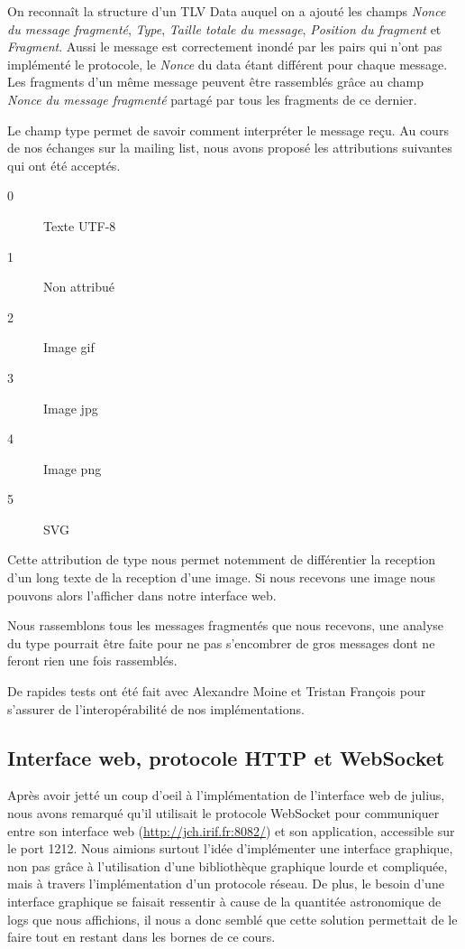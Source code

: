 \documentclass[a4paper,10pt]{article} %
\begin{document}
On reconnaît la structure d'un TLV Data auquel on a ajouté les champs \textit{Nonce du message fragmenté}, \textit{Type}, \textit{Taille totale du message}, \textit{Position du fragment} et \textit{Fragment}. Aussi le message est correctement inondé par les pairs qui n'ont pas implémenté le protocole, le \textit{Nonce} du data étant différent pour chaque message. Les fragments d'un même message peuvent être rassemblés grâce au champ \textit{Nonce du message fragmenté} partagé par tous les fragments de ce dernier.

Le champ type permet de savoir comment interpréter le message reçu. Au cours de nos échanges sur la mailing list, nous avons proposé les attributions suivantes qui ont été acceptés.

\begin{description}
\item[0] Texte UTF-8
\item[1] Non attribué
\item[2] Image gif
\item[3] Image jpg
\item[4] Image png
\item[5] SVG
\end{description}

Cette attribution de type nous permet notemment de différentier la reception d'un long texte de la reception d'une image. Si nous recevons une image nous pouvons alors l'afficher dans notre interface web.

Nous rassemblons tous les messages fragmentés que nous recevons, une analyse du type pourrait être faite pour ne pas s'encombrer de gros messages dont ne feront rien une fois rassemblés.

De rapides tests ont été fait avec \textrm{Alexandre Moine} et \textrm{Tristan François} pour s'assurer de l'interopérabilité de nos implémentations.

\subsection{Interface web, protocole HTTP et WebSocket\label{sec:web}}

Après avoir jetté un coup d'oeil à l'implémentation de l'interface web de julius, nous avons remarqué qu'il utilisait le protocole WebSocket pour communiquer entre son interface web (\href{http://jch.irif.fr:8082/}{http://jch.irif.fr:8082/}) et son application, accessible sur le port 1212. Nous aimions surtout l'idée d'implémenter une interface graphique, non pas grâce à l'utilisation d'une bibliothèque graphique lourde et compliquée, mais à travers l'implémentation d'un protocole réseau. De plus, le besoin d'une interface graphique se faisait ressentir à cause de la quantitée astronomique de logs que nous affichions, il nous a donc semblé que cette solution permettait de le faire tout en restant dans les bornes de ce cours.\\
\end{document}
